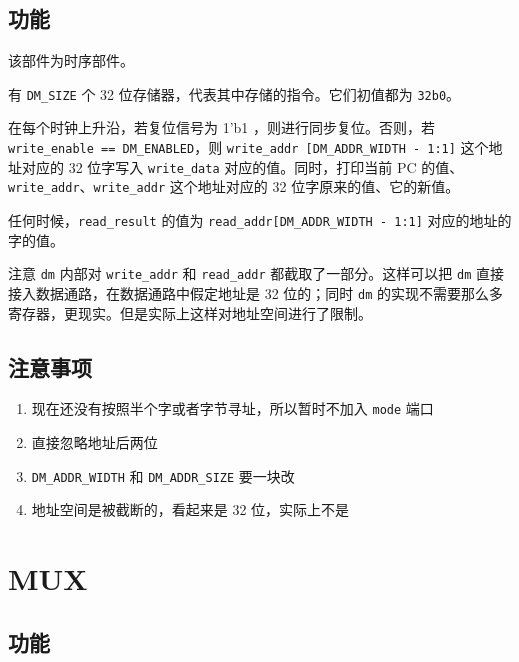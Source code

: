 \documentclass[12pt,AutoFakeBold,AutoFakeSlant]{article}
\providecommand{\tightlist}{%
  \setlength{\itemsep}{0pt}\setlength{\parskip}{0pt}}
\begin{document}
\hypertarget{ux529fux80fd-8}{%
\subsection{功能}\label{ux529fux80fd-8}}

该部件为时序部件。

有 \texttt{DM\_SIZE} 个 32 位存储器，代表其中存储的指令。它们初值都为 \texttt{32\textquotesingle{}b0}。 

在每个时钟上升沿，若复位信号为 1'b1 ，则进行同步复位。否则，若 \texttt{write\_enable\ ==\ DM\_ENABLED}，则
\texttt{write\_addr\ {[}DM\_ADDR\_WIDTH\ -\ 1:1{]}} 这个地址对应的 32 位字写入 \texttt{write\_data} 对应的值。同时，打印当前 PC 的值、\texttt{write\_addr}、\texttt{write\_addr} 这个地址对应的 32 位字原来的值、它的新值。

任何时候，\texttt{read\_result} 的值为
\texttt{read\_addr{[}DM\_ADDR\_WIDTH\ -\ 1:1{]}} 对应的地址的字的值。

注意 \texttt{dm} 内部对 \texttt{write\_addr} 和 \texttt{read\_addr}
都截取了一部分。这样可以把 \texttt{dm}
直接接入数据通路，在数据通路中假定地址是 32 位的；同时 \texttt{dm}
的实现不需要那么多寄存器，更现实。但是实际上这样对地址空间进行了限制。

\hypertarget{ux6ce8ux610fux4e8bux9879-5}{%
\subsection{注意事项}\label{ux6ce8ux610fux4e8bux9879-5}}

\begin{enumerate}
\def\labelenumi{\arabic{enumi}.}
\tightlist
\item
  现在还没有按照半个字或者字节寻址，所以暂时不加入 \texttt{mode} 端口
\item
  直接忽略地址后两位
\item
  \texttt{DM\_ADDR\_WIDTH} 和 \texttt{DM\_ADDR\_SIZE} 要一块改
\item
  地址空间是被截断的，看起来是 32 位，实际上不是
\end{enumerate}

\hypertarget{mux}{%
\section{MUX}\label{mux}}

\hypertarget{ux529fux80fd-9}{%
\subsection{功能}\label{ux529fux80fd-9}}
\end{document}
